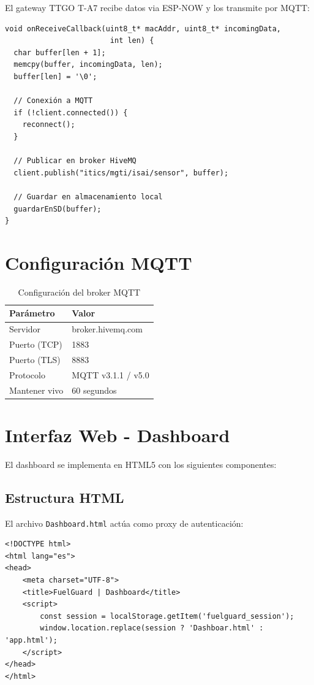 \documentclass[12pt,a4paper,oneside]{report}
\begin{document}
El gateway TTGO T-A7 recibe datos via ESP-NOW y los transmite por MQTT:

\begin{lstlisting}
void onReceiveCallback(uint8_t* macAddr, uint8_t* incomingData, 
                        int len) {
  char buffer[len + 1];
  memcpy(buffer, incomingData, len);
  buffer[len] = '\0';
  
  // Conexión a MQTT
  if (!client.connected()) {
    reconnect();
  }
  
  // Publicar en broker HiveMQ
  client.publish("itics/mgti/isai/sensor", buffer);
  
  // Guardar en almacenamiento local
  guardarEnSD(buffer);
}
\end{lstlisting}

\section{Configuración MQTT}

\begin{table}[H]
    \centering
    \begin{tabular}{|l|l|}
        \hline
        \textbf{Parámetro} & \textbf{Valor} \\
        \hline
        Servidor & broker.hivemq.com \\
        Puerto (TCP) & 1883 \\
        Puerto (TLS) & 8883 \\
        Protocolo & MQTT v3.1.1 / v5.0 \\
        Mantener vivo & 60 segundos \\
        \hline
    \end{tabular}
    \caption{Configuración del broker MQTT}
\end{table}

\section{Interfaz Web - Dashboard}

El dashboard se implementa en HTML5 con los siguientes componentes:

\subsection{Estructura HTML}

El archivo \texttt{Dashboard.html} actúa como proxy de autenticación:

\begin{lstlisting}
<!DOCTYPE html>
<html lang="es">
<head>
    <meta charset="UTF-8">
    <title>FuelGuard | Dashboard</title>
    <script>
        const session = localStorage.getItem('fuelguard_session');
        window.location.replace(session ? 'Dashboar.html' : 'app.html');
    </script>
</head>
</html>
\end{lstlisting}
\end{document}
